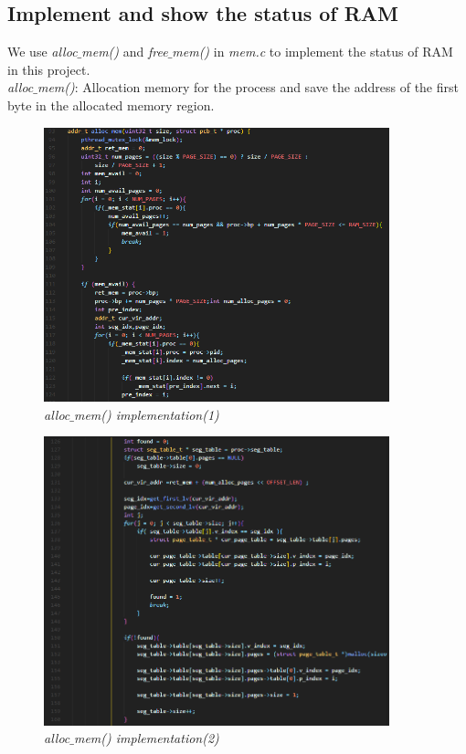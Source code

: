 \documentclass[13pt,a4paper]{article}
\begin{document}
		\subsection{Implement and show the status of RAM}
			We use \textit{alloc$\_$mem()} and \textit{free$\_$mem()} in \textit{mem.c} to implement the status of RAM in this project.\\
			\textit{alloc$\_$mem()}: Allocation memory for the process and save the address of the first byte in the allocated memory region. \newpage
			\begin{figure}[h!]
				\begin{center}
					\includegraphics[width=10cm]{allocmem_1.png}
					\caption{\textit{alloc$\_$mem() implementation(1)}}
				\end{center}
			\end{figure}
			\begin{figure}[h!]
				\begin{center}
					\includegraphics[width=10cm]{allocmem_2.png}
					\caption{\textit{alloc$\_$mem() implementation(2)}}
				\end{center}
			\end{figure}
\end{document}
